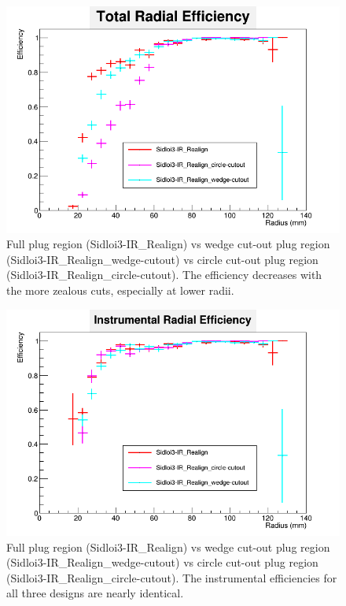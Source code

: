 \documentclass{report}
\begin{document}
                \begin{figure}[H] 
                    \includegraphics[height=.4\textheight]{RadialEfficiency_total_geom}
                    \centering
                    \caption{Full plug region (Sidloi3-IR\_Realign) vs wedge cut-out plug region
                            (Sidloi3-IR\_Realign\_wedge-cutout) vs circle cut-out plug region
                            (Sidloi3-IR\_Realign\_circle-cutout). The efficiency decreases with 
                            the more zealous cuts, especially at lower radii.}
                    \label{fig__geom_beamcal_total}
                \end{figure}
                \begin{figure}[H]
                    \includegraphics[height=.4\textheight]{RadialEfficiency_instrumental_geom}
                    \centering
                    \caption{Full plug region (Sidloi3-IR\_Realign) vs wedge cut-out plug region
                            (Sidloi3-IR\_Realign\_wedge-cutout) vs circle cut-out plug region
                            (Sidloi3-IR\_Realign\_circle-cutout). The instrumental efficiencies
                            for all three designs are nearly identical.}
                    \label{fig__geom_beamcal_inst}
                \end{figure}
\end{document}
